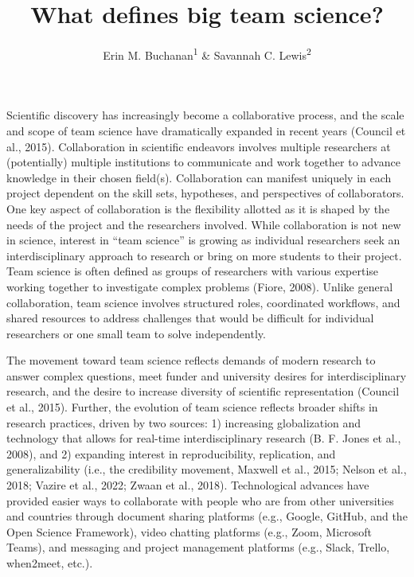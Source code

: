 \documentclass[
  man,floatsintext]{apa7}
\title{What defines big team science?}
\author{Erin M. Buchanan\textsuperscript{1} \& Savannah C. Lewis\textsuperscript{2}}
\date{}
\affiliation{\vspace{0.5cm}\textsuperscript{1} Harrisburg University of Science and Technology\\\textsuperscript{2} University of Alabama}
\begin{document}
\maketitle

Scientific discovery has increasingly become a collaborative process,
and the scale and scope of team science have dramatically expanded in
recent years (Council et al., 2015). Collaboration in scientific endeavors
involves multiple researchers at (potentially) multiple institutions to
communicate and work together to advance knowledge in their chosen
field(s). Collaboration can manifest uniquely in each project dependent
on the skill sets, hypotheses, and perspectives of collaborators. One
key aspect of collaboration is the flexibility allotted as it is shaped
by the needs of the project and the researchers involved. While
collaboration is not new in science, interest in ``team science'' is
growing as individual researchers seek an interdisciplinary approach to
research or bring on more students to their project. Team science is
often defined as groups of researchers with various expertise working
together to investigate complex problems (Fiore, 2008). Unlike general
collaboration, team science involves structured roles, coordinated
workflows, and shared resources to address challenges that would be
difficult for individual researchers or one small team to solve
independently.

The movement toward team science reflects demands of modern research to
answer complex questions, meet funder and university desires for
interdisciplinary research, and the desire to increase diversity of
scientific representation (Council et al., 2015). Further, the evolution of team
science reflects broader shifts in research practices, driven by two
sources: 1) increasing globalization and technology that allows for
real-time interdisciplinary research (B. F. Jones et al., 2008), and 2) expanding
interest in reproducibility, replication, and generalizability (i.e.,
the credibility movement, Maxwell et al., 2015; Nelson et al., 2018; Vazire et al., 2022; Zwaan et al., 2018). Technological advances have provided easier ways to
collaborate with people who are from other universities and countries
through document sharing platforms (e.g., Google, GitHub, and the Open
Science Framework), video chatting platforms (e.g., Zoom, Microsoft
Teams), and messaging and project management platforms (e.g., Slack,
Trello, when2meet, etc.).
\end{document}
